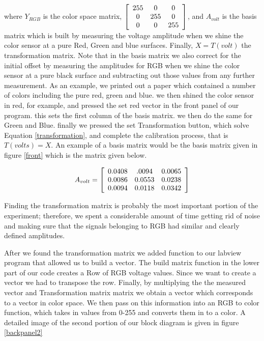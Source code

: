 \documentclass[paper=letter, fontsize=12pt]{article}
\begin{document}
where $Y_{RGB}$ is the color space matrix, $
\left[ {\begin{array}{*{10}c}
   255 & 0  & 0 \\
   0 & 255  & 0 \\
   0 & 0  & 255 \\

 \end{array} } \right]$, and $A_{volt}$ is the basis matrix which is built by measuring the voltage amplitude when we shine the color sensor at a pure Red, Green and blue surfaces. Finally, $X = T(volt)$ the transformation matrix. Note that in the basis matrix we also correct for the initial offset by measuring the amplitudes for RGB when we shine the color sensor at a pure black surface and subtracting out those values from any further measurement. As an example, we printed out a paper which contained a number of colors including the pure red, green and blue. we then shined the color sensor in red, for example, and pressed the  set red vector in the front panel of our program. this sets the first column of the basis matrix. we then do the same for Green and Blue. finally we pressed the set Transformation button, which solve Equation \ref*{transformation}, and complete the calibration process, that is $T(volts) = X $. An example of a basis matrix would be the basis matrix given in figure \ref*{front} which is the matrix given below.

 \begin{equation}
 A_{volt} = 
\left[ {\begin{array}{*{10}c}
   0.0408 & .0094 & 0.0065 \\
   0.0086 & 0.0553  & 0.0238 \\
   0.0094 & 0.0118 & 0.0342 \\

 \end{array} } \right]
 \end{equation}

Finding the transformation matrix is probably the most important portion of the experiment; therefore, we spent a considerable amount of time getting rid of noise and making sure that the signals belonging to RGB had similar and clearly defined amplitudes.

After we found the transformation matrix we added function to our labview program that allowed us to build a vector. The build matrix function in the lower part of our code creates a Row of RGB voltage values. Since we want to create a vector we had to transpose the row. Finally, by multiplying the the measured vector and Transformation matrix matrix we obtain a vector which corresponds to a vector in color space. We then pass on this information into an RGB to color function, which takes in values from 0-255 and converts them in to a color. A detailed image of the second portion of our block diagram is given in figure \ref*{backpanel2}
\end{document}
